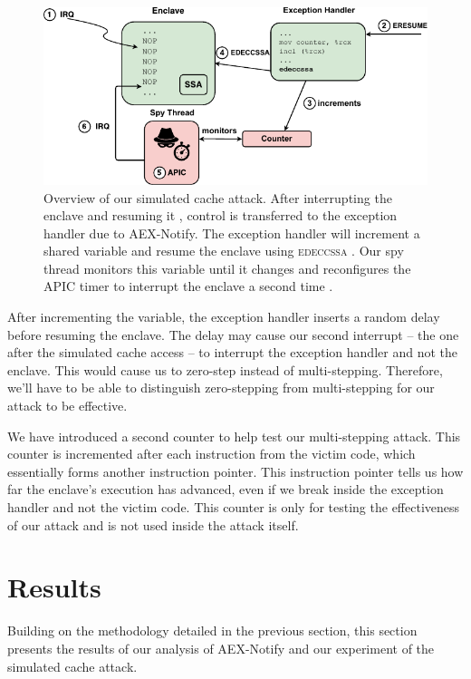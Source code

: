 \documentclass{llncs}
\begin{document}
\begin{figure}[t]
  \includegraphics{images/cache-attack.pdf}
  \caption{Overview of our simulated cache attack.
    After interrupting the enclave  and resuming it ,
    control is transferred to the exception handler due to AEX-Notify.
    The exception handler will increment a shared variable 
    and resume the enclave using \textsc{edeccssa} .
    Our spy thread monitors this variable until it changes and reconfigures
    the APIC timer  to interrupt the enclave a second time .}
\end{figure}

After incrementing the variable, the exception handler inserts a random delay
before resuming the enclave.
The delay may cause our second interrupt -- the one after the simulated cache
access -- to interrupt the exception handler and not the enclave.
This would cause us to zero-step instead of multi-stepping.
Therefore, we'll have to be able to distinguish zero-stepping from
multi-stepping for our attack to be effective.

We have introduced a second counter to help test our multi-stepping attack.
This counter is incremented after each instruction from the victim code,
which essentially forms another instruction pointer.
This instruction pointer tells us how far the enclave's execution has advanced,
even if we break inside the exception handler and not the victim code.
This counter is only for testing the effectiveness of our attack
and is not used inside the attack itself.

\section{Results}

Building on the methodology detailed in the previous section, this section presents
the results of our analysis of AEX-Notify and our experiment of the simulated cache attack.
\end{document}
